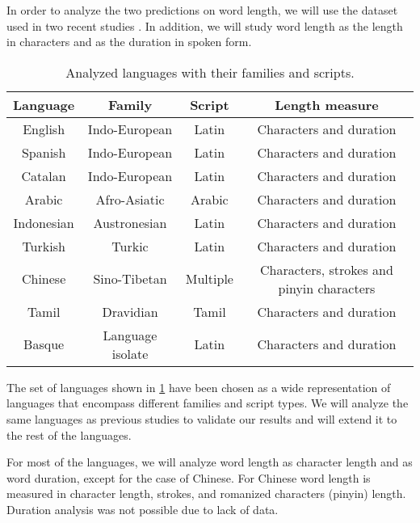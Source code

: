 In order to analyze the two predictions on word length, we will use the dataset used in two recent studies \cite{petrini2022optimality} \cite{petrini2023direct}. In addition, we will study word length as the length in characters and as the duration in spoken form.

\begin{table}[h]
    \centering
    \begin{tabular}{c|c|c|c}
        Language & Family & Script & Length measure \\ \hline
        English & Indo-European & Latin & Characters and duration \\
        Spanish & Indo-European & Latin & Characters and duration \\
        Catalan & Indo-European & Latin & Characters and duration \\
        Arabic & Afro-Asiatic & Arabic & Characters and duration \\
        Indonesian & Austronesian & Latin & Characters and duration \\
        Turkish & Turkic & Latin & Characters and duration \\
        Chinese & Sino-Tibetan & Multiple & Characters, strokes and pinyin characters \\
        Tamil & Dravidian & Tamil & Characters and duration \\
        Basque & Language isolate & Latin & Characters and duration \\
    \end{tabular}
    \caption{Analyzed languages with their families and scripts.}
    \label{tab:languages}
\end{table}

The set of languages shown in \cref{tab:languages} have been chosen as a wide representation of languages that encompass different families and script types. We will analyze the same languages as previous studies to validate our results and will extend it to the rest of the languages.

For most of the languages, we will analyze word length as character length and as word duration, except for the case of Chinese. For Chinese word length is measured in character length, strokes, and romanized characters (pinyin) length. Duration analysis was not possible due to lack of data.

